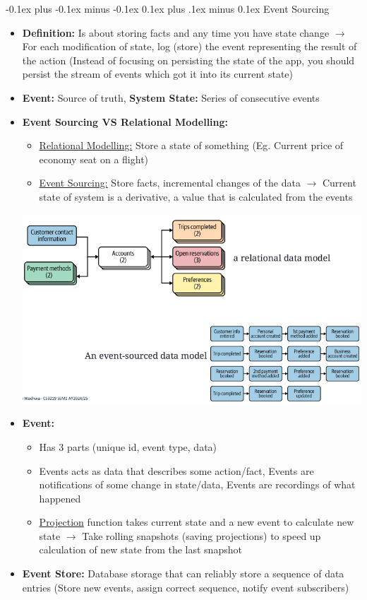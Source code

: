 \documentclass[landscape]{article}
\makeatletter
\renewcommand{\subsection}{\@startsection{subsection}{2}{0mm}%
  {-0.1ex plus -0.1ex minus -0.1ex}%
  {0.1ex plus .1ex minus 0.1ex}%
{\normalfont\scriptsize\bfseries}}
\makeatother
\begin{document}
\begin{multicols*}{5}
    \subsection{Event Sourcing}
    \begin{itemize}
      \item \textbf{Definition:} Is about storing facts and any time you have state change $\rightarrow$ For each modification of state, log (store) the event representing the result of the action (Instead of focusing on persisting the state of the app, you should persist the stream of events which got it into its current state)
      \item \textbf{Event:} Source of truth, \textbf{System State:} Series of consecutive events
      \item \textbf{Event Sourcing VS Relational Modelling:}
      \begin{itemize}
        \item \underline{Relational Modelling:} Store a state of something (Eg. Current price of economy seat on a flight)
        \item \underline{Event Sourcing:} Store facts, incremental changes of the data $\rightarrow$ Current state of system is a derivative, a value that is calculated from the events
      \end{itemize}
      \includegraphics[width=0.85\linewidth]{3_event_sourcing_vs_relational_modelling.png}
      \item \textbf{Event:} 
      \begin{itemize}
        \item Has 3 parts (unique id, event type, data)
        \item Events acts as data that describes some action/fact, Events are notifications of some change in state/data, Events are recordings of what happened
        \item \underline{Projection} function takes current state and a new event to calculate new state $\rightarrow$ Take rolling snapshots (saving projections) to speed up calculation of new state from the last snapshot
      \end{itemize}
      \item \textbf{Event Store:} Database storage that can reliably store a sequence of data entries (Store new events, assign correct sequence, notify event subscribers)
    \end{itemize}


\end{multicols*}
\end{document}
